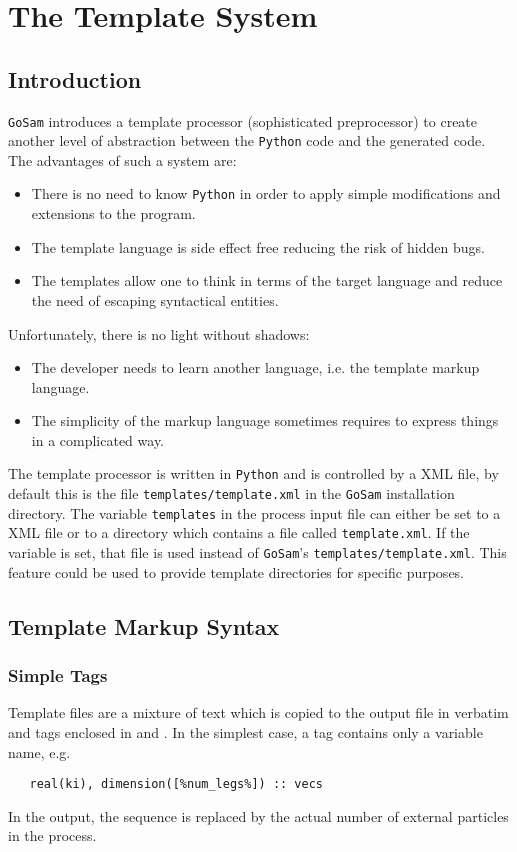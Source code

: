 \documentclass[11pt,a4paper]{refrep}
\newcommand{\golem}{{\tt GoSam}\xspace}
\newcommand{\python}{{\tt Python}\xspace}
\begin{document}
\chapter{The Template System}
\section{Introduction}
\golem{} introduces a template processor (sophisticated preprocessor)
to create another level of abstraction between the \python{} code and
the generated code. The advantages of such a system are:
\begin{itemize}
\item There is no need to know \python{} in order to apply simple
   modifications and extensions to the program.
\item The template language is side effect free reducing the risk
   of hidden bugs.
\item The templates allow one to think in terms of the target language
   and reduce the need of escaping syntactical entities.
\end{itemize}
Unfortunately, there is no light without shadows:
\begin{itemize}
\item The developer needs to learn another language, i.e. the
   template markup language.
\item The simplicity of the markup language sometimes requires
   to express things in a complicated way.
\end{itemize}

The template processor is written in \python{} and is controlled
by a XML file, by default this is the file \texttt{templates/template.xml}
in the \golem{} installation directory.
\attention The variable \texttt{templates} in the process input file
can either be set to a XML file or to a directory which contains
a file called \texttt{template.xml}.
If the variable is set, that
file is used instead of \golem{}'s \texttt{templates/template.xml}.
This feature could be used to provide template directories for specific
purposes.

\section{Template Markup Syntax}
\subsection{Simple Tags}
Template files are a mixture of text which is copied to the output file in
verbatim and tags enclosed in \lit{[\%} and \lit{\%]}. In the simplest
case, a tag contains only a variable name, e.g.
\begin{lstlisting}
   real(ki), dimension([%num_legs%]) :: vecs
\end{lstlisting}
In the output, the sequence  is replaced by the
actual number of external particles in the process.
\end{document}
